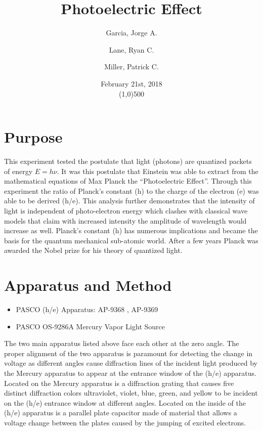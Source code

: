 \documentclass[a4paper, twocolumn]{article}
\title{Photoelectric Effect}
\author{
Garcia, Jorge A.\\
\and
Lane, Ryan C. \\
\and
Miller, Patrick C.
}
\date{February 21st, 2018\\\line(1,0){500}}
\begin{document}
\maketitle

\section{Purpose}
This experiment tested the postulate that light (photons) are quantized packets of energy $E=h\nu$.
It was this postulate that Einstein was able to extract from the mathematical equations of Max Planck the “Photoelectric Effect”.
Through this experiment the ratio of Planck's constant (h) to the charge of the electron (e) was able to be derived (h/e).
This analysis further demonstrates that the intensity of light is independent of photo-electron energy which clashes with
classical wave models that claim with increased intensity the amplitude of wavelength would increase as well.
Planck’s constant (h) has numerous implications and became the basis for the quantum mechanical sub-atomic world. 
After a few years Planck was awarded the Nobel prize for his theory of quantized light.

\section{Apparatus and Method}
\begin{itemize}
 \item PASCO (h/e) Apparatus: AP-9368 , AP-9369
 \item PASCO OS-9286A Mercury Vapor Light Source
\end{itemize}
The two main apparatus listed above face each other at the zero angle. The proper alignment of the two apparatus is paramount
for detecting the change in voltage as different angles cause diffraction lines of the incident light produced by the Mercury
apparatus to appear at the entrance window of the (h/e) apparatus. Located on the Mercury apparatus is a diffraction grating
that causes five distinct diffraction colors ultraviolet, violet, blue, green, and yellow to be incident on the (h/e) entrance
window at different angles. Located on the inside of the (h/e) apparatus is a parallel plate capacitor made of material that
allows a voltage change between the plates caused by the jumping of excited electrons. 
\end{document}
